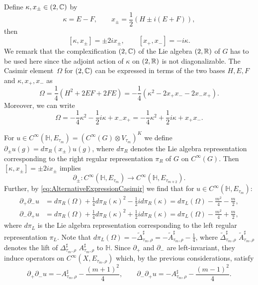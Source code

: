 \documentclass[JEP,XML,SOM,Unicode,NoFloatCountersInSection,published]{cedram}
\theoremstyle{plain}
\theoremstyle{definition}
\theoremstyle{remark}
\newcommand{\R}{\mathbb{R}}
\renewcommand{\H}{\mathbb{H}}
\newcommand{\C}{\mathbb{C}}
\let\sl\relax
\DeclareMathOperator{\sl}{\mathfrak{sl}}
\numberwithin{equation}{section}
\begin{document}
Define $\kappa,x_\pm\in\sl(2,\C)$ by
\[
\kappa = E-F, \qquad x_\pm = \frac{1}{2}(H\pm i(E+F)),
\]
then
\[
[\kappa,x_\pm] = \pm2ix_\pm, \qquad [x_+,x_-] = -i\kappa.
\]
We remark that the complexification $\sl(2,\C)$ of the Lie algebra $\sl(2,\R)$ of $G$ has to be used here since the adjoint action of $\kappa$ on $\sl(2,\R)$ is not diagonalizable. The Casimir element~$\Omega$ for $\sl(2,\C)$ can be expressed in terms of the two bases $H,E,F$ and $\kappa,x_+,x_-$ as
\[
\Omega = \frac{1}{4}(H^2+2EF+2FE) = -\frac{1}{4}(\kappa^2-2x_+x_--2x_-x_+).
\]
Moreover, we can write
\begin{equation}
\Omega = -\frac{1}{4}\kappa^2-\frac{1}{2}i\kappa+x_-x_+ = -\frac{1}{4}\kappa^2+\frac{1}{2}i\kappa+x_+x_-.\label{eq:AlternativeExpressionCasimir}
\end{equation}

For $u\in C^\infty(\H,E_{\tau_m})=(C^\infty(G)\otimes V_{\tau_m})^K$ we define $\partial_\pm u(g)=d\pi_R(x_\pm)u(g)$, where $d\pi_R$ denotes the Lie algebra representation corresponding to the right regular representation $\pi_R$ of $G$ on $C^\infty(G)$. Then $[\kappa,x_\pm]=\pm 2ix_\pm$ implies
\[
\partial_\pm:C^\infty(\H,E_{\tau_m})\to C^\infty(\H,E_{\tau_{m\mp2}}).
\]
Further, by \cref{eq:AlternativeExpressionCasimir} we find that for $u\in C^\infty(\H,E_{\tau_m})$:
\begin{align*}
\partial_+\partial_-u &= d\pi_R(\Omega)+\frac{1}{4}d\pi_R(\kappa)^2-\frac{1}{2}id\pi_R(\kappa) = d\pi_L(\Omega)-\frac{m^2}{4}-\frac{m}{2},\\
\partial_-\partial_+u &= d\pi_R(\Omega)+\frac{1}{4}d\pi_R(\kappa)^2+\frac{1}{2}id\pi_R(\kappa) = d\pi_L(\Omega)-\frac{m^2}{4}+\frac{m}{2},
\end{align*}
where $d\pi_L$ is the Lie algebra representation corresponding to the left regular representation $\pi_L$. Note that $d\pi_L(\Omega)=-\widetilde{\Delta}_{\tau_m,\rho}^\sharp=-\widetilde{A}_{\tau_m,\rho}^\sharp-\frac{1}{4}$, where $\widetilde{\Delta}_{\tau_m,\rho}^\sharp$ \resp $\widetilde{A}_{\tau_m,\rho}^\sharp$ denotes the lift of $\Delta_{\tau_m,\rho}^\sharp$ \resp $A_{\tau_m,\rho}^\sharp$ to $\H$. Since $\partial_+$ and $\partial_-$ are left-invariant, they induce operators on $C^\infty(X,E_{\tau_m,\rho})$ which, by the previous considerations, satisfy
\begin{equation}
\partial_+\partial_-u = -A_{\tau_m,\rho}^\sharp-\frac{(m+1)^2}{4}, \qquad \partial_-\partial_+u = -A_{\tau_m,\rho}^\sharp-\frac{(m-1)^2}{4}.\label{eq:PartialPlusMinusVsLaplacian}
\end{equation}
\end{document}
